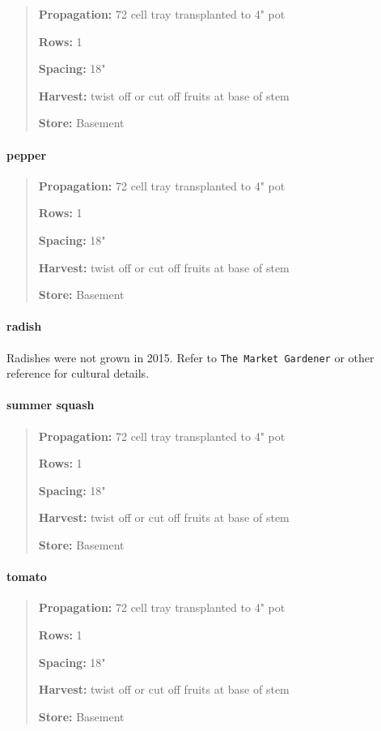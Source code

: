\begin{quote}
\textbf{Propagation:} 72 cell tray transplanted to 4" pot

\textbf{Rows:} 1

\textbf{Spacing:} 18"

\textbf{Harvest:} twist off or cut off fruits at base of stem

\textbf{Store:} Basement
\end{quote}

\paragraph{pepper}\label{pepper}

\begin{quote}
\textbf{Propagation:} 72 cell tray transplanted to 4" pot

\textbf{Rows:} 1

\textbf{Spacing:} 18"

\textbf{Harvest:} twist off or cut off fruits at base of stem

\textbf{Store:} Basement
\end{quote}

\paragraph{radish}\label{radish}

Radishes were not grown in 2015. Refer to \texttt{The Market Gardener}
or other reference for cultural details.

\paragraph{summer squash}\label{summer-squash}

\begin{quote}
\textbf{Propagation:} 72 cell tray transplanted to 4" pot

\textbf{Rows:} 1

\textbf{Spacing:} 18"

\textbf{Harvest:} twist off or cut off fruits at base of stem

\textbf{Store:} Basement
\end{quote}

\paragraph{tomato}\label{tomato}

\begin{quote}
\textbf{Propagation:} 72 cell tray transplanted to 4" pot

\textbf{Rows:} 1

\textbf{Spacing:} 18"

\textbf{Harvest:} twist off or cut off fruits at base of stem

\textbf{Store:} Basement
\end{quote}

